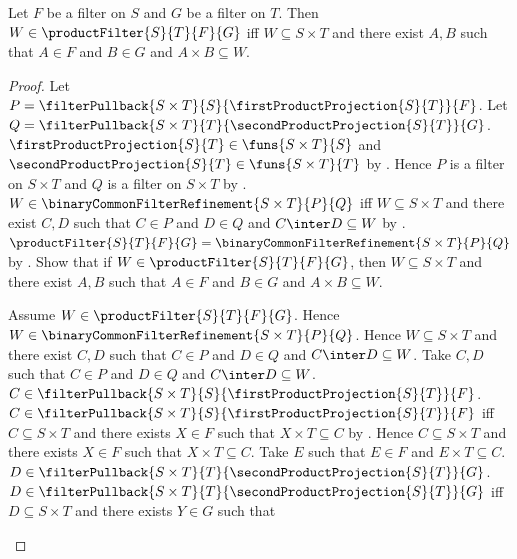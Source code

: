 \begin{theorem}\label{product_filter_iff}
    Let $F$ be a filter on $S$ and $G$ be a filter on $T$.
    Then $W\in\productFilter{S}{T}{F}{G}$ iff
        $W\subseteq S\times T$ and there exist $A,B$ such that
        $A\in F$ and $B\in G$ and $A\times B\subseteq W$.
\end{theorem}
\begin{proof}
    Let $P=\filterPullback{S\times T}{S}{
        \firstProductProjection{S}{T}}{F}$.
    Let $Q=\filterPullback{S\times T}{T}{
        \secondProductProjection{S}{T}}{G}$.
    $\firstProductProjection{S}{T}\in\funs{S\times T}{S}$ and
        $\secondProductProjection{S}{T}\in\funs{S\times T}{T}$ by
        .
    Hence $P$ is a filter on $S\times T$ and $Q$ is a filter on
        $S\times T$ by
        .
    $W\in\binaryCommonFilterRefinement{S\times T}{P}{Q}$ iff
        $W\subseteq S\times T$ and there exist $C,D$ such that
        $C\in P$ and $D\in Q$ and $C\inter D\subseteq W$ by
        .
    $\productFilter{S}{T}{F}{G}
        =\binaryCommonFilterRefinement{S\times T}{P}{Q}$ by
        .
    Show that if $W\in\productFilter{S}{T}{F}{G}$, then
        $W\subseteq S\times T$ and there exist $A,B$ such that
        $A\in F$ and $B\in G$ and $A\times B\subseteq W$.
    \begin{subproof}
        Assume $W\in\productFilter{S}{T}{F}{G}$.
        Hence $W\in\binaryCommonFilterRefinement{S\times T}{P}{Q}$.
        Hence $W\subseteq S\times T$ and there exist $C,D$ such that
            $C\in P$ and $D\in Q$ and $C\inter D\subseteq W$.
        Take $C,D$ such that $C\in P$ and $D\in Q$ and
            $C\inter D\subseteq W$.
        $C\in\filterPullback{S\times T}{S}{
            \firstProductProjection{S}{T}}{F}$.
        $C\in\filterPullback{S\times T}{S}{
            \firstProductProjection{S}{T}}{F}$ iff
            $C\subseteq S\times T$ and there exists $X\in F$ such that
            $X\times T\subseteq C$ by
            .
        Hence $C\subseteq S\times T$ and there exists $X\in F$ such that
            $X\times T\subseteq C$.
        Take $E$ such that $E\in F$ and $E\times T\subseteq C$.
        $D\in\filterPullback{S\times T}{T}{
            \secondProductProjection{S}{T}}{G}$.
        $D\in\filterPullback{S\times T}{T}{
            \secondProductProjection{S}{T}}{G}$ iff
            $D\subseteq S\times T$ and there exists $Y\in G$ such that

\end{subproof}
\end{proof}
